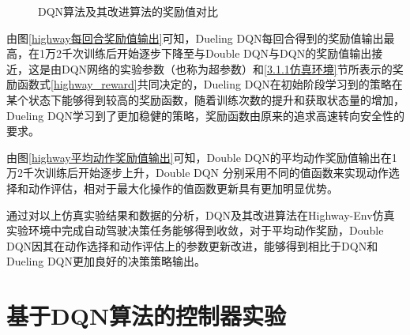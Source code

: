 \begin{figure}[htbp]
    \vspace{13pt}
    \centering
    \caption{DQN算法及其改进算法的奖励值对比}\label{DQN算法及其改进算法的奖励值对比} 
\end{figure}

由图\ref{highway每回合奖励值输出}可知，Dueling DQN每回合得到的奖励值输出最高，在1万2千次训练后开始逐步下降至与Double DQN与DQN的奖励值输出接近，这是由DQN网络的实验参数（也称为超参数）和\ref{3.1.1仿真环境}节所表示的奖励函数式\ref{highway_reward}共同决定的，Dueling DQN在初始阶段学习到的策略在某个状态下能够得到较高的奖励函数，随着训练次数的提升和获取状态量的增加，Dueling DQN学习到了更加稳健的策略，奖励函数由原来的追求高速转向安全性的要求。

由图\ref{highway平均动作奖励值输出}可知，Double DQN的平均动作奖励值输出在1万2千次训练后开始逐步上升，Double DQN 分别采用不同的值函数来实现动作选择和动作评估，相对于最大化操作的值函数更新具有更加明显优势。

通过对以上仿真实验结果和数据的分析，DQN及其改进算法在Highway-Env仿真实验环境中完成自动驾驶决策任务能够得到收敛，对于平均动作奖励，Double DQN因其在动作选择和动作评估上的参数更新改进，能够得到相比于DQN和Dueling DQN更加良好的决策策略输出。

\newpage

\section{基于DQN算法的控制器实验}\label{基于DQN算法的控制器实验}

